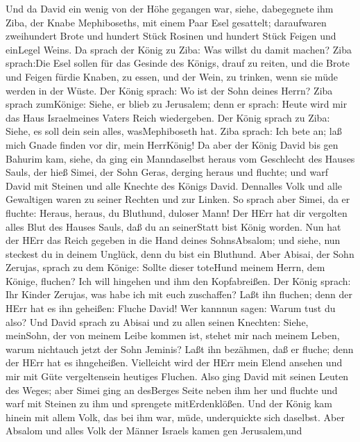  Und da David ein wenig von der Höhe gegangen war, siehe,
dabegegnete ihm Ziba, der Knabe Mephiboseths, mit einem Paar Esel
gesattelt; daraufwaren zweihundert Brote und hundert Stück Rosinen und
hundert Stück Feigen und einLegel Weins.  Da sprach der
König zu Ziba: Was willst du damit machen? Ziba sprach:Die Esel sollen
für das Gesinde des Königs, drauf zu reiten, und die Brote und Feigen
fürdie Knaben, zu essen, und der Wein, zu trinken, wenn sie müde werden
in der Wüste.  Der König sprach: Wo ist der Sohn deines
Herrn? Ziba sprach zumKönige: Siehe, er blieb zu Jerusalem; denn er
sprach: Heute wird mir das Haus Israelmeines Vaters Reich wiedergeben.
 Der König sprach zu Ziba: Siehe, es soll dein sein alles,
wasMephiboseth hat. Ziba sprach: Ich bete an; laß mich Gnade finden vor
dir, mein HerrKönig!  Da aber der König David bis gen
Bahurim kam, siehe, da ging ein Manndaselbst heraus vom Geschlecht des
Hauses Sauls, der hieß Simei, der Sohn Geras, derging heraus und
fluchte;  und warf David mit Steinen und alle Knechte des
Königs David. Dennalles Volk und alle Gewaltigen waren zu seiner Rechten
und zur Linken.  So sprach aber Simei, da er fluchte:
Heraus, heraus, du Bluthund, duloser Mann!  Der HErr hat dir
vergolten alles Blut des Hauses Sauls, daß du an seinerStatt bist König
worden. Nun hat der HErr das Reich gegeben in die Hand deines
SohnsAbsalom; und siehe, nun steckest du in deinem Unglück, denn du bist
ein Bluthund.  Aber Abisai, der Sohn Zerujas, sprach zu dem
Könige: Sollte dieser toteHund meinem Herrn, dem Könige, fluchen? Ich
will hingehen und ihm den Kopfabreißen.  Der König sprach:
Ihr Kinder Zerujas, was habe ich mit euch zuschaffen? Laßt ihn fluchen;
denn der HErr hat es ihn geheißen: Fluche David! Wer kannnun sagen:
Warum tust du also?  Und David sprach zu Abisai und zu
allen seinen Knechten: Siehe, meinSohn, der von meinem Leibe kommen ist,
stehet mir nach meinem Leben, warum nichtauch jetzt der Sohn Jeminis?
Laßt ihn bezähmen, daß er fluche; denn der HErr hat es ihngeheißen.
 Vielleicht wird der HErr mein Elend ansehen und mir mit
Güte vergeltensein heutiges Fluchen.  Also ging David mit
seinen Leuten des Weges; aber Simei ging an desBerges Seite neben ihm
her und fluchte und warf mit Steinen zu ihm und sprengete
mitErdenklößen.  Und der König kam hinein mit allem Volk,
das bei ihm war, müde, underquickte sich daselbst.  Aber
Absalom und alles Volk der Männer Israels kamen gen Jerusalem,und
